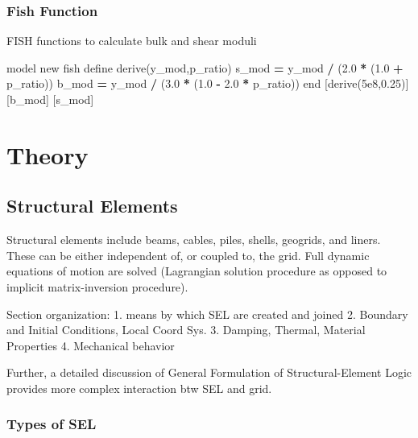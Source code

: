 \documentclass[a4paper, nobind]{templates/ociamthesis}
\newenvironment{Shaded}{\begin{snugshade}}{\end{snugshade}}
\newcommand{\FloatTok}[1]{\textcolor[rgb]{0.00,0.00,0.81}{#1}}
\newcommand{\NormalTok}[1]{#1}
\newcommand{\OperatorTok}[1]{\textcolor[rgb]{0.81,0.36,0.00}{\textbf{#1}}}
\renewenvironment{Shaded}
{
  \vspace{10pt}%
  \begin{snugshade}%
}{%
  \end{snugshade}%
  \vspace{8pt}%
}
\begin{document}
\hypertarget{fish-function}{%
\subsection{Fish Function}\label{fish-function}}

FISH functions to calculate bulk and shear moduli

\begin{Shaded}
\begin{Highlighting}[]
\NormalTok{model new}
\NormalTok{fish define derive(y\_mod,p\_ratio)}
\NormalTok{    s\_mod }\OperatorTok{=}\NormalTok{ y\_mod }\OperatorTok{/}\NormalTok{ (}\FloatTok{2.0} \OperatorTok{*}\NormalTok{ (}\FloatTok{1.0} \OperatorTok{+}\NormalTok{ p\_ratio))}
\NormalTok{    b\_mod }\OperatorTok{=}\NormalTok{ y\_mod }\OperatorTok{/}\NormalTok{ (}\FloatTok{3.0} \OperatorTok{*}\NormalTok{ (}\FloatTok{1.0} \OperatorTok{{-}} \FloatTok{2.0} \OperatorTok{*}\NormalTok{ p\_ratio))}
\NormalTok{end}
\NormalTok{[derive(}\FloatTok{5e8}\NormalTok{,}\FloatTok{0.25}\NormalTok{)]}
\NormalTok{[b\_mod] }
\NormalTok{[s\_mod]}
\end{Highlighting}
\end{Shaded}

\newpage

\hypertarget{theory}{%
\chapter{Theory}\label{theory}}

\hypertarget{structural-elements-1}{%
\section{Structural Elements}\label{structural-elements-1}}

Structural elements include beams, cables, piles, shells, geogrids, and
liners. These can be either independent of, or coupled to, the grid.
Full dynamic equations of motion are solved (Lagrangian solution
procedure as opposed to implicit matrix-inversion procedure).

Section organization: 1. means by which SEL are created and joined 2.
Boundary and Initial Conditions, Local Coord Sys. 3. Damping, Thermal,
Material Properties 4. Mechanical behavior

Further, a detailed discussion of General Formulation of
Structural-Element Logic provides more complex interaction btw SEL and
grid.

\hypertarget{types-of-sel}{%
\subsection{Types of SEL}\label{types-of-sel}}
\end{document}
